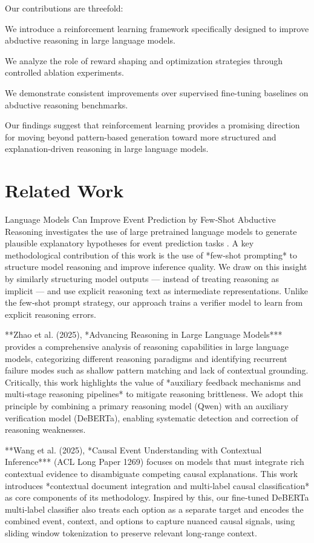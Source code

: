 \documentclass{article}
\begin{document}
Our contributions are threefold:

We introduce a reinforcement learning framework specifically designed to improve abductive reasoning in large language models.

We analyze the role of reward shaping and optimization strategies through controlled ablation experiments.

We demonstrate consistent improvements over supervised fine-tuning baselines on abductive reasoning benchmarks.

Our findings suggest that reinforcement learning provides a promising direction for moving beyond pattern-based generation toward more structured and explanation-driven reasoning in large language models.

\section{Related Work}

Language Models Can Improve Event Prediction by Few‑Shot Abductive Reasoning investigates the use of large pretrained language models to generate plausible explanatory hypotheses for event prediction tasks \cite{li2023language}. A key methodological contribution of this work is the use of *few‑shot prompting* to structure model reasoning and improve inference quality. We draw on this insight by similarly structuring model outputs — instead of treating reasoning as implicit — and use explicit reasoning text as intermediate representations. Unlike the few‑shot prompt strategy, our approach trains a verifier model to learn from explicit reasoning errors.

**Zhao et al. (2025), *Advancing Reasoning in Large Language Models*** provides a comprehensive analysis of reasoning capabilities in large language models, categorizing different reasoning paradigms and identifying recurrent failure modes such as shallow pattern matching and lack of contextual grounding. Critically, this work highlights the value of *auxiliary feedback mechanisms and multi‑stage reasoning pipelines* to mitigate reasoning brittleness. We adopt this principle by combining a primary reasoning model (Qwen) with an auxiliary verification model (DeBERTa), enabling systematic detection and correction of reasoning weaknesses.

**Wang et al. (2025), *Causal Event Understanding with Contextual Inference*** (ACL Long Paper 1269) focuses on models that must integrate rich contextual evidence to disambiguate competing causal explanations. This work introduces *contextual document integration and multi‑label causal classification* as core components of its methodology. Inspired by this, our fine‑tuned DeBERTa multi‑label classifier also treats each option as a separate target and encodes the combined event, context, and options to capture nuanced causal signals, using sliding window tokenization to preserve relevant long‑range context.
\end{document}
